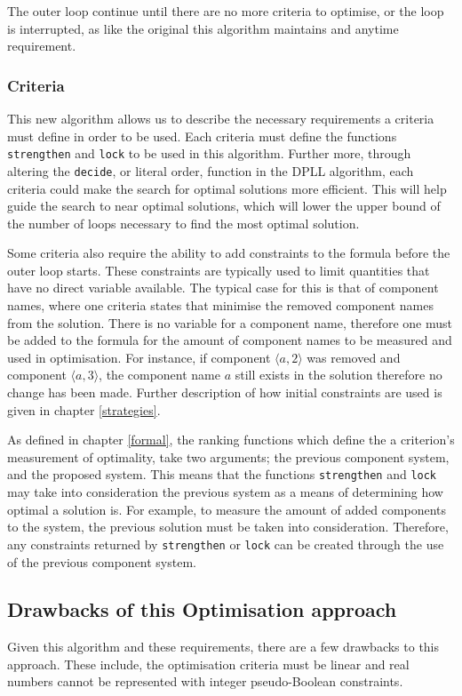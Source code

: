 The outer loop continue until there are no more criteria to optimise, or the loop is interrupted, as like the original this algorithm maintains and anytime requirement.

\subsubsection{Criteria}
This new algorithm allows us to describe the necessary requirements a criteria must define in order to be used.
Each criteria must define the functions \verb+strengthen+ and \verb+lock+ to be used in this algorithm.
Further more, through altering the \verb+decide+, or literal order, function in the DPLL algorithm, each criteria could make the search for optimal solutions more efficient.
This will help guide the search to near optimal solutions, which will lower the upper bound of the number of loops necessary to find the most optimal solution.

Some criteria also require the ability to add constraints to the formula before the outer loop starts.
These constraints are typically used to limit quantities that have no direct variable available.
The typical case for this is that of component names, where one criteria states that minimise the removed component names from the solution.
There is no variable for a component name, therefore one must be added to the formula for the amount of component names to be measured and used in optimisation.
For instance, if component $\langle a,2\rangle$ was removed and component $\langle a,3 \rangle$, the component name $a$ still exists in the solution therefore no change has been made.
Further description of how initial constraints are used is given in chapter \ref{strategies}. 
 
As defined in chapter \ref{formal}, the ranking functions which define the a criterion's measurement of optimality, take two arguments;
the previous component system, and the proposed system.
This means that the functions \verb+strengthen+ and \verb+lock+ may take into consideration the previous system as a means of determining how optimal a solution is.
For example, to measure the amount of added components to the system, the previous solution must be taken into consideration.
Therefore, any constraints returned by \verb+strengthen+ or \verb+lock+ can be created through the use of the previous component system. 

\subsection{Drawbacks of this Optimisation approach}
Given this algorithm and these requirements, there are a few drawbacks to this approach.
These include, the optimisation criteria must be linear and real numbers cannot be represented with integer pseudo-Boolean constraints.

